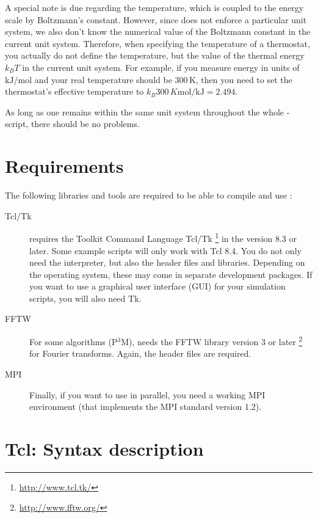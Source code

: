 A special note is due regarding the temperature, which is coupled to
the energy scale by Boltzmann's constant. However, since \es{} does not
enforce a particular unit system, we also don't know the numerical value
of the Boltzmann constant in the current unit system. Therefore, when
specifying the temperature of a thermostat, you actually do not define
the temperature, but the value of the thermal energy $k_B T$ in the
current unit system. For example, if you measure energy in units of
$\mathrm{kJ/mol}$ and your real temperature should be 300\,K, then you need to
set the thermostat's effective temperature to
$k_B 300\, K \mathrm{mol / kJ} = 2.494$.

As long as one remains within the same unit system throughout the
whole \es-script, there should be no problems.

\section{Requirements}
\label{sec:requirements}

The following libraries and tools are required to be able to compile
and use \es:

\begin{description}
\item[Tcl/Tk]  \es{} requires the Toolkit Command
  Language Tcl/Tk \footnote{\url{http://www.tcl.tk/}} in the version
  8.3 or later.  Some example scripts will only work with Tcl 8.4. You
  do not only need the interpreter, but also the header files and
  libraries.  Depending on the operating system, these may come in
  separate development packages. If you want to use a graphical user
  interface (GUI) for your simulation scripts, you will also need Tk.
  
\item[FFTW]  For some algorithms (\eg P$^3$M), \es needs
  the FFTW library version 3 or later
  \footnote{\url{http://www.fftw.org/}} for Fourier transforms.
  Again, the header files are required.
  
\item[MPI]  Finally, if you want to use \es in parallel,
  you need a working MPI environment (that implements the MPI standard
  version 1.2).
\end{description}


\section{Tcl: Syntax description}
\label{sec:syntax}


